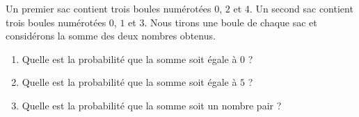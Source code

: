 
\begin{exercice}\label{exosmath-0195}

Un premier sac contient trois boules numérotées \( 0\), \( 2\) et \( 4\). Un second sac contient trois boules numérotées \( 0\), \( 1\) et \( 3\). Nous tirons une boule de chaque sac et considérons la somme des deux nombres obtenus.
\begin{enumerate}
    \item
        Quelle est la probabilité que la somme soit égale à \( 0\) ?
    \item
        Quelle est la probabilité que la somme soit égale à \( 5\) ?
    \item
        Quelle est la probabilité que la somme soit un nombre pair ?
\end{enumerate}

\end{exercice}
